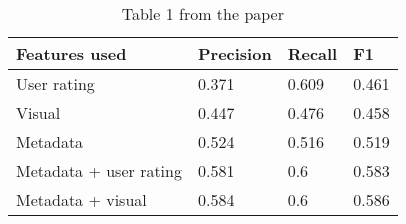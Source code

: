 \documentclass[sigconf]{acmart}
\begin{document}
\begin{table}[hbt!]
  \caption*{Table 1 from the paper}
  \begin{tabular}{llll}
    \hline
    Features used          & Precision & Recall & F1    \\ \hline
    User rating            & 0.371     & 0.609  & 0.461 \\
    Visual                 & 0.447     & 0.476  & 0.458 \\
    Metadata               & 0.524     & 0.516  & 0.519 \\
    Metadata + user rating & 0.581     & 0.6    & 0.583 \\
    Metadata + visual      & 0.584     & 0.6    & 0.586 \\ \hline
  \end{tabular}
\end{table}
\end{document}
